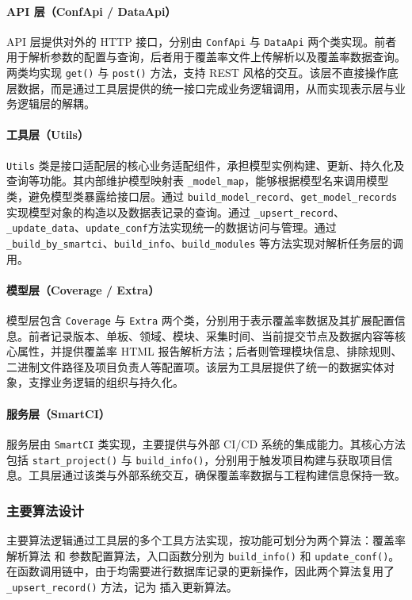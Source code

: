 \paragraph{API 层（ConfApi / DataApi）}
API 层提供对外的 HTTP 接口，分别由 \verb|ConfApi| 与 \verb|DataApi| 两个类实现。前者用于解析参数的配置与查询，后者用于覆盖率文件上传解析以及覆盖率数据查询。两类均实现 \verb|get()| 与 \verb|post()| 方法，支持 REST 风格的交互。该层不直接操作底层数据，而是通过工具层提供的统一接口完成业务逻辑调用，从而实现表示层与业务逻辑层的解耦。

\paragraph{工具层（Utils）}
\verb|Utils| 类是接口适配层的核心业务适配组件，承担模型实例构建、更新、持久化及查询等功能。其内部维护模型映射表 \verb|_model_map|，能够根据模型名来调用模型类，避免模型类暴露给接口层。通过 \verb|build_model_record|、\verb|get_model_records| 实现模型对象的构造以及数据表记录的查询。通过 \verb|_upsert_record|、\verb|_update_data|、\verb|update_conf|方法实现统一的数据访问与管理。通过 \verb|_build_by_smartci|、\verb|build_info|、\verb|build_modules| 等方法实现对解析任务层的调用。

\paragraph{模型层（Coverage / Extra）}
模型层包含 \verb|Coverage| 与 \verb|Extra| 两个类，分别用于表示覆盖率数据及其扩展配置信息。前者记录版本、单板、领域、模块、采集时间、当前提交节点及数据内容等核心属性，并提供覆盖率 HTML 报告解析方法；后者则管理模块信息、排除规则、二进制文件路径及项目负责人等配置项。该层为工具层提供了统一的数据实体对象，支撑业务逻辑的组织与持久化。

\paragraph{服务层（SmartCI）}
服务层由 \verb|SmartCI| 类实现，主要提供与外部 CI/CD 系统的集成能力。其核心方法包括 \verb|start_project()| 与 \verb|build_info()|，分别用于触发项目构建与获取项目信息。工具层通过该类与外部系统交互，确保覆盖率数据与工程构建信息保持一致。

\subsubsection{主要算法设计}
主要算法逻辑通过工具层的多个工具方法实现，按功能可划分为两个算法：覆盖率解析算法 和 参数配置算法，入口函数分别为 \verb|build_info()| 和 \verb|update_conf()|。在函数调用链中，由于均需要进行数据库记录的更新操作，因此两个算法复用了\verb|_upsert_record()| 方法，记为 插入更新算法。

